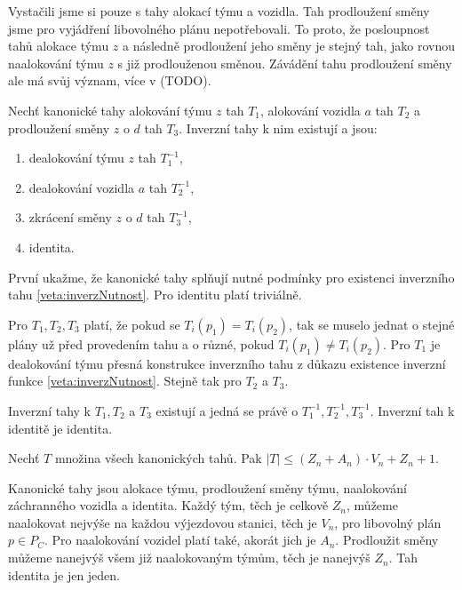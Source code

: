 Vystačili jsme si pouze s tahy alokací týmu a vozidla.
Tah prodloužení směny jsme pro vyjádření libovolného plánu nepotřebovali.
To proto, že posloupnost tahů alokace týmu $z$ a následně prodloužení jeho směny je stejný tah, jako rovnou naalokování týmu $z$ s již prodlouženou směnou.
Závádění tahu prodloužení směny ale má svůj význam, více v (TODO).

\begin{veta}
  Nechť kanonické tahy alokování týmu $z$ tah $T_1$, alokování vozidla $a$ tah $T_2$ a prodloužení směny $z$ o $d$ tah $T_3$.
  Inverzní tahy k nim existují a jsou:

  \begin{enumerate}
    \item
      dealokování týmu $z$ tah $T_1^{-1}$,

    \item
      dealokování vozidla $a$ tah $T_2^{-1}$,

    \item
      zkrácení směny $z$ o $d$ tah $T_3^{-1}$,

    \item
      identita.
  \end{enumerate}
\end{veta}
\begin{dukaz}
  První ukažme, že kanonické tahy splňují nutné podmínky pro existenci inverzního tahu \ref{veta:inverzNutnost}.
  Pro identitu platí triviálně.

  Pro $T_1, T_2, T_3$ platí, že pokud se $T_i(p_1) = T_i(p_2)$, tak se muselo jednat o stejné plány už před provedením tahu a o různé, pokud $T_i(p_1) \neq T_i(p_2)$.
  Pro $T_1$ je dealokování týmu přesná konstrukce inverzního tahu z důkazu existence inverzní funkce \ref{veta:inverzNutnost}.
  Stejně tak pro $T_2$ a $T_3$.

  Inverzní tahy k $T_1, T_2$ a $T_3$ existují a jedná se právě o $T_1^{-1}, T_2^{-1}, T_3^{-1}$.
  Inverzní tah k identitě je identita.
\end{dukaz}

\begin{veta}\label{veta:pocetKanTahu}
  Nechť $T$ množina všech kanonických tahů. Pak $|T| \leq (Z_n + A_n) \cdot V_n + Z_n + 1$.
\end{veta}
\begin{dukaz}
  Kanonické tahy jsou alokace týmu, prodloužení směny týmu, naalokování záchranného vozidla a identita.
  Každý tým, těch je celkově $Z_n$, můžeme naalokovat nejvýše na každou výjezdovou stanici, těch je $V_n$, pro libovolný plán $p \in P_C$.
  Pro naalokování vozidel platí také, akorát jich je $A_n$.
  Prodloužit směny můžeme nanejvýš všem již naalokovaným týmům, těch je nanejvýš $Z_n$.
  Tah identita je jen jeden.
\end{dukaz}

